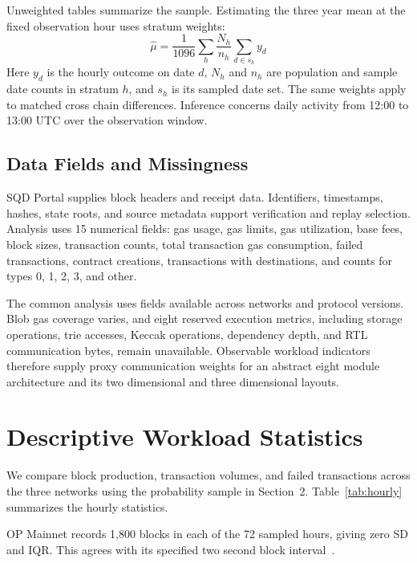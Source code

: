 \documentclass[runningheads]{llncs}
\begin{document}
Unweighted tables summarize the sample. Estimating the three year mean at the fixed observation hour uses stratum weights:
\begin{equation}
\widehat{\mu}=\frac{1}{1096}\sum_h\frac{N_h}{n_h}\sum_{d\in s_h}y_d\label{eq:stratified}
\end{equation}
Here $y_d$ is the hourly outcome on date $d$, $N_h$ and $n_h$ are population and sample date counts in stratum $h$, and $s_h$ is its sampled date set. The same weights apply to matched cross chain differences. Inference concerns daily activity from 12:00 to 13:00 UTC over the observation window.

\subsection{Data Fields and Missingness}
SQD Portal supplies block headers and receipt data. Identifiers, timestamps, hashes, state roots, and source metadata support verification and replay selection. Analysis uses 15 numerical fields: gas usage, gas limits, gas utilization, base fees, block sizes, transaction counts, total transaction gas consumption, failed transactions, contract creations, transactions with destinations, and counts for types 0, 1, 2, 3, and other.

The common analysis uses fields available across networks and protocol versions. Blob gas coverage varies, and eight reserved execution metrics, including storage operations, trie accesses, Keccak operations, dependency depth, and RTL communication bytes, remain unavailable. Observable workload indicators therefore supply proxy communication weights for an abstract eight module architecture and its two dimensional and three dimensional layouts.

\section{Descriptive Workload Statistics}
We compare block production, transaction volumes, and failed transactions across the three networks using the probability sample in Section~2. Table~\ref{tab:hourly} summarizes the hourly statistics.


OP Mainnet records 1,800 blocks in each of the 72 sampled hours, giving zero SD and IQR. This agrees with its specified two second block interval~\cite{opinterval}.
\end{document}
